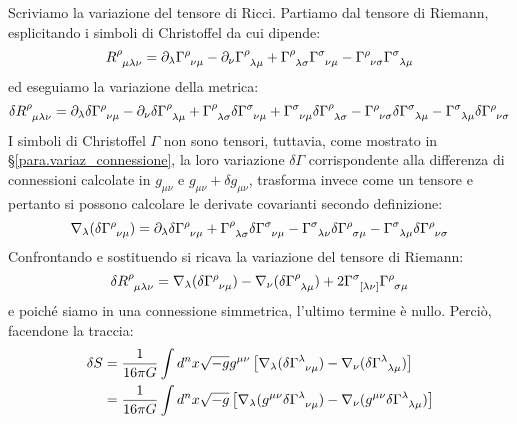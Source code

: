 Scriviamo la variazione del tensore di Ricci. Partiamo dal tensore di Riemann, esplicitando i simboli di Christoffel da cui dipende:
\begin{equation*}
    \tensor{R}{^\rho_{\mu\lambda\nu}} = \partial_\lambda \tensor{\Gamma}{^\rho_{\nu\mu}} - \partial_\nu \tensor{\Gamma}{^\rho_{\lambda\mu}} +\tensor{\Gamma}{^\rho _{\lambda\sigma}}\tensor{\Gamma}{^\sigma_{\nu\mu}} - \tensor{\Gamma}{^\rho _{\nu\sigma}}\tensor{\Gamma}{^\sigma_{\lambda\mu}}
\end{equation*}
ed eseguiamo la variazione della metrica:
\begin{equation*}
    \delta\tensor{R}{^\rho_{\mu\lambda\nu}} = \partial_\lambda \delta\tensor{\Gamma}{^\rho_{\nu\mu}} - \partial_\nu \delta\tensor{\Gamma}{^\rho_{\lambda\mu}} +\tensor{\Gamma}{^\rho _{\lambda\sigma}}\delta\tensor{\Gamma}{^\sigma_{\nu\mu}} +\tensor{\Gamma}{^\sigma_{\nu\mu}}\delta\tensor{\Gamma}{^\rho _{\lambda\sigma}}- \tensor{\Gamma}{^\rho _{\nu\sigma}}\delta\tensor{\Gamma}{^\sigma_{\lambda\mu}} - \tensor{\Gamma}{^\sigma_{\lambda\mu}}\delta\tensor{\Gamma}{^\rho _{\nu\sigma}}
\end{equation*}
I simboli di Christoffel $\Gamma$ non sono tensori, tuttavia, come mostrato in \S\ref{para.variaz_connessione}, la loro variazione $\delta \Gamma$ corrispondente alla differenza di connessioni calcolate in $g_{\mu\nu}$ e $g_{\mu\nu} + \delta g_{\mu\nu}$, trasforma invece come un tensore e pertanto si possono calcolare le derivate covarianti secondo definizione:
\begin{equation*}
    \nabla_\lambda(\delta\tensor{\Gamma}{^\rho_{\nu\mu}}) = \partial_\lambda \delta\tensor{\Gamma}{^\rho_{\nu\mu}} + \tensor{\Gamma}{^\rho_{\lambda\sigma}}\delta\tensor{\Gamma}{^\sigma_{\nu\mu}} - \tensor{\Gamma}{^\sigma_{\lambda\nu}}\delta\tensor{\Gamma}{^\rho_{\sigma\mu}} - \tensor{\Gamma}{^\sigma_{\lambda\mu}}\delta\tensor{\Gamma}{^\rho_{\nu\sigma}}
\end{equation*}
Confrontando e sostituendo si ricava la variazione del tensore di Riemann:
\begin{equation}
    \delta \tensor{R}{^\rho_{\mu\lambda\nu}} = \nabla_\lambda(\delta\tensor{\Gamma}{^\rho_{\nu\mu}}) - \nabla_\nu(\delta\tensor{\Gamma}{^\rho_{\lambda\mu}}) + 2 \tensor{\Gamma}{^\sigma_{[\lambda\nu]}}\tensor{\Gamma}{^\rho_{\sigma\mu}} 
\end{equation}
e poiché siamo in una connessione simmetrica, l'ultimo termine è nullo. Perciò, facendone la traccia:
\begin{align*}
    \delta S &= \frac{1}{16\pi G} \int d^n x \sqrt{-g}g^{\mu\nu}\left[\nabla_\lambda(\delta\tensor{\Gamma}{^\lambda_{\nu\mu}}) - \nabla_\nu(\delta\tensor{\Gamma}{^\lambda_{\lambda\mu}}) \right] \\
    &= \frac{1}{16\pi G} \int d^n x\sqrt{-g}\left[ \nabla_\lambda(g^{\mu\nu}\delta\tensor{\Gamma}{^\lambda_{\nu\mu}}) - \nabla_\nu(g^{\mu\nu}\delta\tensor{\Gamma}{^\lambda_{\lambda\mu}}) \right]
\end{align*}
